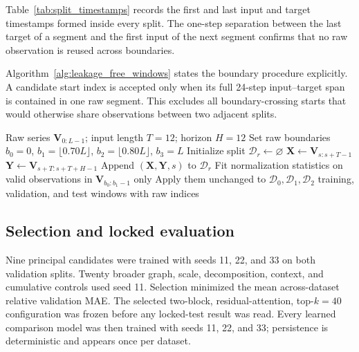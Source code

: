 \documentclass[fleqn,10pt]{wlscirep}
\newenvironment{changedcontent}{\color{changeblue}}{}
\begin{document}
Table~\ref{tab:split_timestamps} records the first and last input and target
timestamps formed inside every split. The one-step separation between the last
target of a segment and the first input of the next segment confirms that no
raw observation is reused across boundaries.
\begin{table}[t]
\centering
\caption{Exact temporal endpoints of the independently constructed windows.
PeMS-BAY timestamps include the recorded Pacific-time UTC offset; METR-LA
timestamps are reported as stored in the dataset index.}
\label{tab:split_timestamps}
\scriptsize
\resizebox{\textwidth}{!}{}
\end{table}

\begin{changedcontent}
Algorithm~\ref{alg:leakage_free_windows} states the boundary procedure
explicitly. A candidate start index is accepted only when its full 24-step
input--target span is contained in one raw segment. This excludes all
boundary-crossing starts that would otherwise share observations between two
adjacent splits.
\begin{algorithm}[H]
\caption{Leakage-free chronological splitting and window construction}
\label{alg:leakage_free_windows}
\begin{algorithmic}[1]
\Require Raw series $\mathbf{V}_{0:L-1}$; input length $T=12$; horizon $H=12$
\State Set raw boundaries $b_0=0$, $b_1=\lfloor0.70L\rfloor$,
$b_2=\lfloor0.80L\rfloor$, $b_3=L$
  \State Initialize split $\mathcal{D}_r\gets\varnothing$
    \State $\mathbf{X}\gets\mathbf{V}_{s:s+T-1}$
    \State $\mathbf{Y}\gets\mathbf{V}_{s+T:s+T+H-1}$
    \State Append $(\mathbf{X},\mathbf{Y},s)$ to $\mathcal{D}_r$
  \EndFor
\EndFor
\State Fit normalization statistics on valid observations in
$\mathbf{V}_{b_0:b_1-1}$ only
\State Apply them unchanged to $\mathcal{D}_0,\mathcal{D}_1,\mathcal{D}_2$
\State \Return training, validation, and test windows with raw indices
\end{algorithmic}
\end{algorithm}
\end{changedcontent}

\subsection{Selection and locked evaluation}
Nine principal candidates were trained with seeds 11, 22, and 33 on both
validation splits. Twenty broader graph, scale, decomposition, context, and
cumulative controls used seed 11. Selection minimized the mean across-dataset
relative validation MAE. The selected two-block, residual-attention,
top-$k=40$ configuration was frozen before any locked-test result was read.
Every learned comparison model was then trained with seeds 11, 22, and 33;
persistence is deterministic and appears once per dataset.
\end{document}
